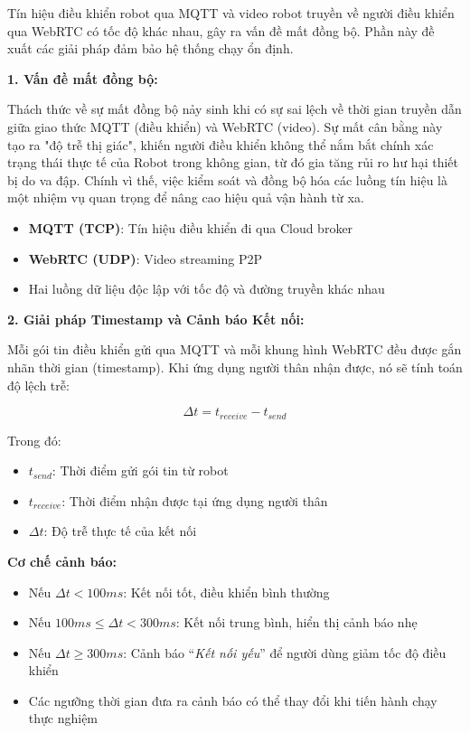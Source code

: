 Tín hiệu điều khiển robot qua MQTT và video robot truyền về người điều khiển qua WebRTC có tốc độ khác nhau, gây ra vấn đề mất đồng bộ. Phần này đề xuất các giải pháp đảm bảo hệ thống chạy ổn định.

\textbf{1. Vấn đề mất đồng bộ:}

Thách thức về sự mất đồng bộ nảy sinh khi có sự sai lệch về thời gian truyền dẫn giữa giao thức MQTT (điều khiển) và WebRTC (video). Sự mất cân bằng này tạo ra "độ trễ thị giác", khiến người điều khiển không thể nắm bắt chính xác trạng thái thực tế của Robot trong không gian, từ đó gia tăng rủi ro hư hại thiết bị do va đập. Chính vì thế, việc kiểm soát và đồng bộ hóa các luồng tín hiệu là một nhiệm vụ quan trọng để nâng cao hiệu quả vận hành từ xa.
\begin{itemize}
    \item \textbf{MQTT (TCP)}: Tín hiệu điều khiển đi qua Cloud broker
    \item \textbf{WebRTC (UDP)}: Video streaming P2P
    \item Hai luồng dữ liệu độc lập với tốc độ và đường truyền khác nhau
\end{itemize}

\textbf{2. Giải pháp Timestamp và Cảnh báo Kết nối:}

Mỗi gói tin điều khiển gửi qua MQTT và mỗi khung hình WebRTC đều được gắn nhãn thời gian (timestamp). Khi ứng dụng người thân nhận được, nó sẽ tính toán độ lệch trễ:

\begin{equation}
\Delta t = t_{receive} - t_{send}
\end{equation}

Trong đó:
\begin{itemize}
    \item $t_{send}$: Thời điểm gửi gói tin từ robot
    \item $t_{receive}$: Thời điểm nhận được tại ứng dụng người thân
    \item $\Delta t$: Độ trễ thực tế của kết nối
\end{itemize}

\textbf{Cơ chế cảnh báo:}
\begin{itemize}
    \item Nếu $\Delta t < 100ms$: Kết nối tốt, điều khiển bình thường
    \item Nếu $100ms \leq \Delta t < 300ms$: Kết nối trung bình, hiển thị cảnh báo nhẹ
    \item Nếu $\Delta t \geq 300ms$: Cảnh báo ``\textit{Kết nối yếu}'' để người dùng giảm tốc độ điều khiển
    \item Các ngưỡng thời gian đưa ra cảnh báo có thể thay đổi khi tiến hành chạy thực nghiệm
\end{itemize}

